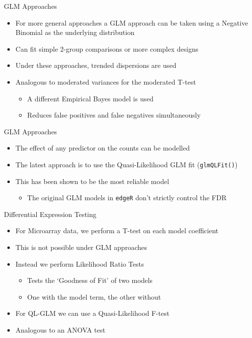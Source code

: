 \documentclass[aspectratio=169,11pt]{beamer}
\begin{document}
\begin{frame}{GLM Approaches}

	\begin{itemize}
		\item For more general approaches a GLM approach can be taken using a Negative Binomial as the underlying distribution
		\item Can fit simple 2-group comparisons or more complex designs
		\item Under these approaches, trended dispersions are used
		\item Analogous to moderated variances for the moderated T-test
		\begin{itemize}
			\item A different Empirical Bayes model is used
			\item Reduces false positives and false negatives simultaneously
		\end{itemize}
	\end{itemize}

\end{frame}

\begin{frame}{GLM Approaches}

	\begin{itemize}
		\item The effect of any predictor on the counts can be modelled
		\item The latest approach is to use the Quasi-Likelihood GLM fit (\texttt{glmQLFit()})
		\item This has been shown to be the most reliable model
		\begin{itemize}
			\item The original GLM models in \texttt{edgeR} don't strictly control the FDR
		\end{itemize}
	\end{itemize}

\end{frame}

\begin{frame}{Differential Expression Testing}

	\begin{itemize}
		\item For Microarray data, we perform a T-test on each model coefficient
		\item This is not possible under GLM approaches
		\item Instead we perform Likelihood Ratio Tests
		\begin{itemize}
			\item Tests the `Goodness of Fit' of two models
			\item One with the model term, the other without
		\end{itemize}
		\item For QL-GLM we can use a Quasi-Likelihood F-test
		\item Analogous to an ANOVA test
	\end{itemize}

\end{frame}
\end{document}
